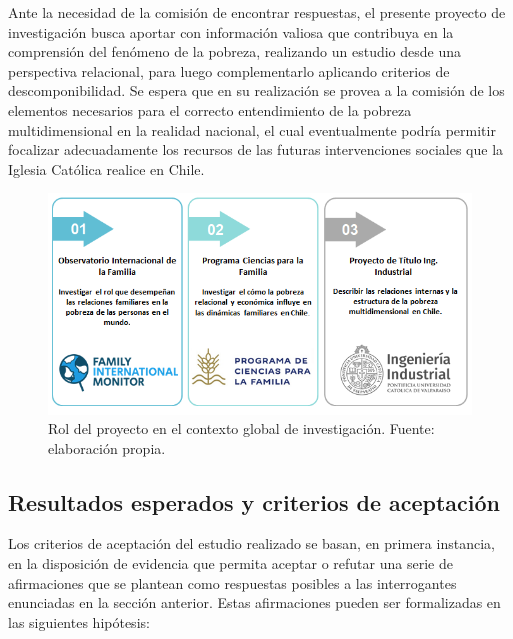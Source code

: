 \documentclass[12pt,letterpaper,spanish]{article}
\begin{document}
Ante la necesidad de la comisión de encontrar respuestas, el presente proyecto de investigación busca aportar con información valiosa que contribuya en la comprensión del fenómeno de la pobreza, realizando un estudio desde una perspectiva relacional, para luego complementarlo aplicando criterios de descomponibilidad. Se espera que en su realización se provea a la comisión de los elementos necesarios para el correcto entendimiento de la pobreza multidimensional en la realidad nacional, el cual eventualmente podría permitir focalizar adecuadamente los recursos de las futuras intervenciones sociales que la Iglesia Católica realice en Chile.


\begin{figure}[H]
    \centering
    \includegraphics[width=\textwidth]{Max/problema.png}
    \caption{Rol del proyecto en el contexto global de investigación. Fuente: elaboración propia.}
    \label{problema}
\end{figure}



\subsection{Resultados esperados y criterios de aceptación}


Los criterios de aceptación del estudio realizado se basan, en primera instancia, en la disposición de evidencia que permita aceptar o refutar una serie de afirmaciones que se plantean como respuestas posibles a las interrogantes enunciadas en la sección anterior. Estas afirmaciones pueden ser formalizadas en las siguientes hipótesis:
\end{document}
